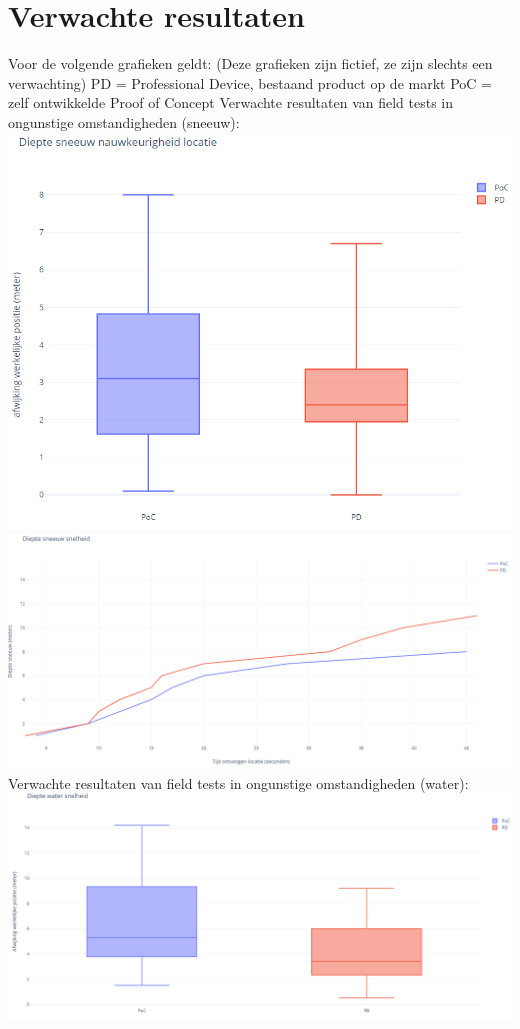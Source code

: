 \section{Verwachte resultaten}
\label{sec:verwachte_resultaten}
Voor de volgende grafieken geldt: (Deze grafieken zijn fictief, ze zijn slechts een verwachting)
\newline
PD = Professional Device, bestaand product op de markt
\newline
PoC = zelf ontwikkelde Proof of Concept
\clearpage
Verwachte resultaten van field tests in ongunstige omstandigheden (sneeuw):
\newline
\includegraphics[width=\textwidth,height=\textheight,keepaspectratio]{snowAccuracy}
\includegraphics[width=\textwidth,height=\textheight,keepaspectratio]{snowDepth}
\clearpage
Verwachte resultaten van field tests in ongunstige omstandigheden (water):
\newline
\includegraphics[width=\textwidth,height=\textheight,keepaspectratio]{waterAccuracy}
